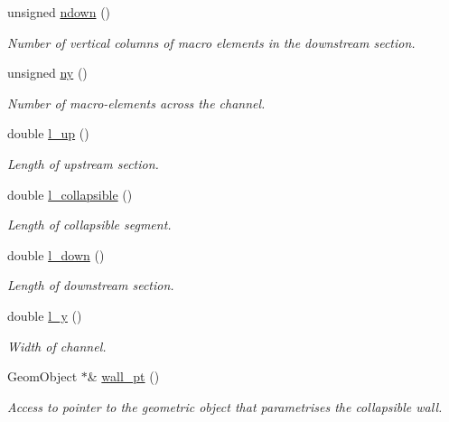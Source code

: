 \begin{DoxyCompactItemize}
unsigned \hyperlink{classoomph_1_1CollapsibleChannelDomain_a0e1c69ac122606e4f883e96b51989d9f}{ndown} ()
\begin{DoxyCompactList}\small\item\em Number of vertical columns of macro elements in the downstream section. \end{DoxyCompactList}\item 
unsigned \hyperlink{classoomph_1_1CollapsibleChannelDomain_a62e15782984f3d5e10ba44a6d8ad06ee}{ny} ()
\begin{DoxyCompactList}\small\item\em Number of macro-\/elements across the channel. \end{DoxyCompactList}\item 
double \hyperlink{classoomph_1_1CollapsibleChannelDomain_a3773afa34e21e3e4ed7a86cf42808dd7}{l\+\_\+up} ()
\begin{DoxyCompactList}\small\item\em Length of upstream section. \end{DoxyCompactList}\item 
double \hyperlink{classoomph_1_1CollapsibleChannelDomain_a0b38028581a27e6b34529ba2c3fa1af2}{l\+\_\+collapsible} ()
\begin{DoxyCompactList}\small\item\em Length of collapsible segment. \end{DoxyCompactList}\item 
double \hyperlink{classoomph_1_1CollapsibleChannelDomain_a93dc02b16ab1cbab2f42f62d0a7aeb8e}{l\+\_\+down} ()
\begin{DoxyCompactList}\small\item\em Length of downstream section. \end{DoxyCompactList}\item 
double \hyperlink{classoomph_1_1CollapsibleChannelDomain_ab95f48218b922883be6c8b9bfb39c2a8}{l\+\_\+y} ()
\begin{DoxyCompactList}\small\item\em Width of channel. \end{DoxyCompactList}\item 
Geom\+Object $\ast$\& \hyperlink{classoomph_1_1CollapsibleChannelDomain_a0a98c02b478d61d2cd4c899d0d37344a}{wall\+\_\+pt} ()
\begin{DoxyCompactList}\small\item\em Access to pointer to the geometric object that parametrises the collapsible wall. \end{DoxyCompactList}\item 

\end{DoxyCompactItemize}
